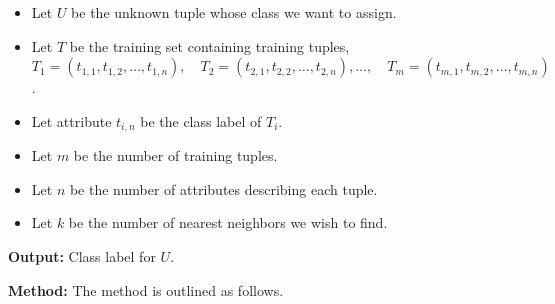 \begin{itemize}
	
	\item Let $U$ be the unknown tuple whose class we want to assign.
	
	\item Let $T$ be the training set containing training tuples, 
	$T_{1} = (t_{1, 1}, t_{1, 2}, \ldots, t_{1, n}),\quad T_{2} = (t_{2, 1}, t_{2, 2}, \ldots, t_{2, n}), \ldots, \quad
	T_{m} = (t_{m, 1}, t_{m, 2}, \ldots, t_{m, n})$.

	\item Let attribute $t_{i, n}$ be the class label of $T_{i}$.
	
	\item Let $m$ be the number of training tuples.

	\item Let $n$ be the number of attributes describing each tuple.
	
	\item Let $k$ be the number of nearest neighbors we wish to find.

\end{itemize}

\textbf{Output:} Class label for $U$.

\clearpage

\textbf{Method:} The method is outlined as follows.

